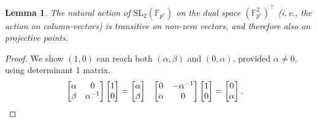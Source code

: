 \documentclass[11pt]{article}
\numberwithin{equation}{section}
\theoremstyle{definition}
\theoremstyle{plain}
\newcommand{\ie}{i.\,e.}
\numberwithin{equation}{section}
\theoremstyle{plain}       %
\newtheorem{lem}[equation]{Lemma}
\theoremstyle{remark}
\theoremstyle{definition}
\numberwithin{figure}{section}
\numberwithin{table}{section}
\newcommand{\bbF}{\mathbb{F}}  %
\begin{document}
\begin{lem}\label{lem:first-trans}
	The natural action of $\mathrm{SL}_2(\bbF_{p^e})$ on the dual space
	$(\bbF_{p^e}^{2})^{\top}$ (\ie, the action on column-vectors) is transitive
	on non-zero vectors, and therefore also on projective points.
\end{lem}
\begin{proof}
	We show $(1,0)$ can reach both $(\alpha,\beta)$ and $(0,\alpha)$, provided
	$\alpha\neq 0$, using determinant 1 matrix.
	\begin{align*}
	\begin{bmatrix} \alpha & 0 \\ \beta & \alpha^{-1} \end{bmatrix}
	\begin{bmatrix} 1\\ 0 \end{bmatrix}
	& = \begin{bmatrix}\alpha\\ \beta\end{bmatrix} &
	\begin{bmatrix} 0 & -\alpha^{-1} \\ \alpha & 0 \end{bmatrix}
	\begin{bmatrix} 1\\ 0 \end{bmatrix}
	& = \begin{bmatrix} 0 \\ \alpha\end{bmatrix}. \qedhere
	\end{align*}
\end{proof}
\end{document}
